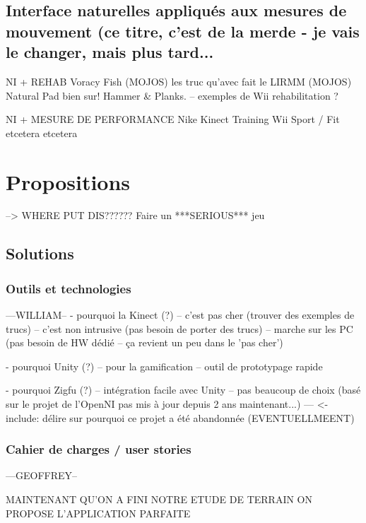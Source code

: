 \documentclass{report}
\begin{document}
		
		\section{Interface naturelles appliqués aux mesures de mouvement 
		(ce titre, c'est de la merde - je vais le changer, mais plus tard...}

		NI + REHAB
		Voracy Fish (MOJOS)
		les truc qu'avec fait le LIRMM (MOJOS)
 		Natural Pad bien sur! Hammer \& Planks.
		-- exemples de Wii rehabilitation ?
		
		NI + MESURE DE PERFORMANCE
		Nike Kinect Training
		Wii Sport / Fit
		etcetera etcetera
		
		
	\chapter{Propositions}
	
	
	
		--> WHERE PUT DIS?????? Faire un ***SERIOUS*** jeu
		
		
		
		\section{Solutions}
		
		\subsection{Outils et technologies} 		---WILLIAM--
		- pourquoi la Kinect (?)
		-- c'est pas cher (trouver des exemples de trucs)
		-- c'est non intrusive (pas besoin de porter des trucs)
		-- marche sur les PC (pas besoin de HW dédié -- ça revient un peu dans le 'pas cher')
		
		- pourquoi Unity (?)
		-- pour la gamification
		-- outil de prototypage rapide
		
		- pourquoi Zigfu (?)
		-- intégration facile avec Unity
		-- pas beaucoup de choix (basé sur le projet de l'OpenNI pas mis à jour depuis 2 ans maintenant...)
		--- <- include: délire sur pourquoi ce projet a été abandonnée (EVENTUELLMEENT)
		
		
		\subsection{Cahier de charges / user stories} 		---GEOFFREY--
		
		MAINTENANT QU'ON A FINI NOTRE ETUDE DE TERRAIN ON PROPOSE L'APPLICATION PARFAITE 
		
\end{document}
